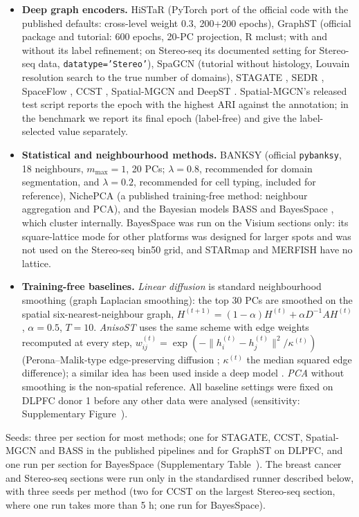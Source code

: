 \documentclass[unnumsec,webpdf,contemporary,large]{oup-authoring-template}
\begin{document}
\begin{itemize}
\item \textbf{Deep graph encoders.} HiSTaR \citep{yu2025histar} (PyTorch port of the official code with the published
defaults: cross-level weight 0.3, 200+200 epochs), GraphST \citep{long2023graphst} (official package and tutorial: 600 epochs,
20-PC projection, R mclust; with and without its label refinement; on Stereo-seq its documented setting for Stereo-seq data,
\texttt{datatype='Stereo'}), SpaGCN \citep{hu2021spagcn} (tutorial without histology,
Louvain resolution search to the true number of domains), STAGATE \citep{dong2022stagate}, SEDR \citep{xu2024sedr},
SpaceFlow \citep{ren2022spaceflow}, CCST \citep{li2022ccst}, Spatial-MGCN \citep{wang2023spatialmgcn} and DeepST
\citep{xu2022deepst}. Spatial-MGCN's released test script reports the epoch with the highest ARI against the annotation;
in the benchmark we report its final epoch (label-free) and give the label-selected value separately.
\item \textbf{Statistical and neighbourhood methods.} BANKSY \citep{singhal2024banksy} (official \texttt{pybanksy},
18 neighbours, $m_{\max}=1$, 20 PCs; $\lambda=0.8$, recommended for domain segmentation, and $\lambda=0.2$, recommended for cell
typing, included for reference), NichePCA \citep{nichepca2025} (a published training-free method: neighbour aggregation and PCA),
and the Bayesian models BASS \citep{li2022bass} and BayesSpace \citep{zhao2021bayesspace}, which cluster internally. BayesSpace
was run on the Visium sections only: its square-lattice mode for other platforms was designed for larger spots and was not used on the Stereo-seq bin50 grid, and STARmap and MERFISH have no lattice.
\item \textbf{Training-free baselines.} \emph{Linear diffusion} is standard neighbourhood smoothing (graph Laplacian
smoothing): the top 30 PCs are smoothed on the spatial six-nearest-neighbour graph,
$H^{(t+1)}=(1-\alpha)H^{(t)}+\alpha D^{-1}AH^{(t)}$, $\alpha=0.5$, $T=10$. \emph{AnisoST} uses the same scheme with edge weights
recomputed at every step, $w_{ij}^{(t)}=\exp(-\|h_i^{(t)}-h_j^{(t)}\|^2/\kappa^{(t)})$ (Perona--Malik-type edge-preserving
diffusion \citep{perona1990}; $\kappa^{(t)}$ the median squared edge difference); a similar idea has been used inside a deep
model \citep{wang2024pearlst}. \emph{PCA} without smoothing is the non-spatial reference. All baseline settings were fixed on
DLPFC donor 1 before any other data were analysed (sensitivity: Supplementary Figure~\SFsens).
\end{itemize}
Seeds: three per section for most methods; one for STAGATE, CCST, Spatial-MGCN and BASS in the published pipelines and for
GraphST on DLPFC, and one run per section for BayesSpace (Supplementary Table~\STcov). The breast cancer and Stereo-seq sections
were run only in the standardised runner described below, with three seeds per method (two for CCST on the largest Stereo-seq
section, where one run takes more than 5 h; one run for BayesSpace).
\end{document}
